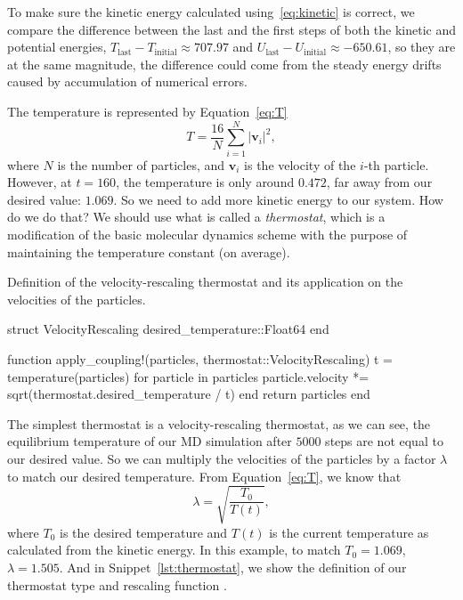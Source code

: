 To make sure the kinetic energy calculated using~\eqref{eq:kinetic} is correct, we compare
the difference between the last and the first steps of both the kinetic and potential
energies, $T_\text{last} - T_\text{initial} \approx 707.97$ and
$U_\text{last} - U_\text{initial} \approx -650.61$, so they are at the same magnitude,
the difference could come from the steady energy drifts caused by accumulation of
numerical errors.

The temperature is represented by Equation~\eqref{eq:T}
%
\begin{equation}\label{eq:T}
    T = \frac{ 16 }{ N } \sum_{i=1}^{N} \lvert \bm{v}_i \rvert^2,
\end{equation}
%
where $N$ is the number of particles, and $\bm{v}_i$ is the velocity of the $i$-th particle.
However, at $t = 160$, the temperature is only around $0.472$, far away from our desired
value: $1.069$. So we need to add more kinetic energy to our system. How do we do that?
We should use what is called a \emph{thermostat}, which is
a modiﬁcation of the basic molecular dynamics scheme with the purpose of maintaining the
temperature constant (on average).

\begin{algorithm}[H]
    \caption{Definition of the velocity-rescaling thermostat and its application
        on the velocities of the particles.}
    \label{lst:thermostat}
    \begin{juliacode}
        struct VelocityRescaling
            desired_temperature::Float64
        end

        function apply_coupling!(particles, thermostat::VelocityRescaling)
            t = temperature(particles)
            for particle in particles
                particle.velocity *= sqrt(thermostat.desired_temperature / t)
            end
            return particles
        end
    \end{juliacode}
\end{algorithm}

The simplest thermostat is a velocity-rescaling thermostat, as we can see, the equilibrium
temperature of our MD simulation after $5000$ steps are not equal to our desired value.
So we can multiply the velocities of the particles by a factor $\lambda$ to match our
desired temperature.
From Equation~\ref{eq:T}, we know that
%
\begin{equation}
    \lambda = \sqrt{\frac{ T_0 }{ T(t) }},
\end{equation}
%
where $T_0$ is the desired temperature and $T(t)$ is the current temperature as
calculated from the kinetic energy.
In this example, to match $T_0 = 1.069$, $\lambda = 1.505$.
And in Snippet~\ref{lst:thermostat}, we show the definition of our thermostat type
 and rescaling function .

